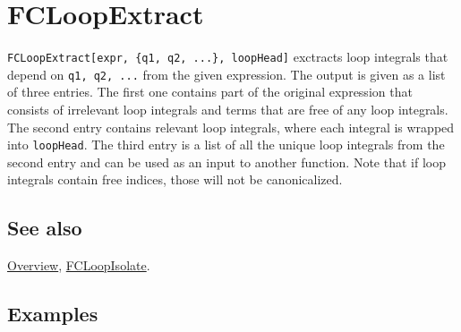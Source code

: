 \documentclass[../FeynCalcManual.tex]{subfiles}
\begin{document}
\hypertarget{fcloopextract}{
\section{FCLoopExtract}\label{fcloopextract}}

\texttt{FCLoopExtract[\allowbreak{}expr,\ \allowbreak{}\{\allowbreak{}q1,\ \allowbreak{}q2,\ \allowbreak{}...\},\ \allowbreak{}loopHead]}
exctracts loop integrals that depend on
\texttt{q1,\ \allowbreak{}q2,\ \allowbreak{}...} from the given
expression. The output is given as a list of three entries. The first
one contains part of the original expression that consists of irrelevant
loop integrals and terms that are free of any loop integrals. The second
entry contains relevant loop integrals, where each integral is wrapped
into \texttt{loopHead}. The third entry is a list of all the unique loop
integrals from the second entry and can be used as an input to another
function. Note that if loop integrals contain free indices, those will
not be canonicalized.

\subsection{See also}

\hyperlink{toc}{Overview}, \hyperlink{fcloopisolate}{FCLoopIsolate}.

\subsection{Examples}

\begin{Shaded}
\begin{Highlighting}[]
\OperatorTok{[}\OperatorTok{[} \SpecialCharTok{{-}}\OperatorTok{]}\OperatorTok{[} \SpecialCharTok{{-}}\OperatorTok{]} \SpecialCharTok{+} \OperatorTok{[}\OperatorTok{]}\OperatorTok{[}\OperatorTok{,}\OperatorTok{]}\OperatorTok{[}\OperatorTok{,}  \SpecialCharTok{{-}}\OperatorTok{,} \OperatorTok{\{} \SpecialCharTok{{-}}\OperatorTok{,} \OperatorTok{\}]]} 
 
\OperatorTok{[}\SpecialCharTok{\%}\OperatorTok{,} \OperatorTok{\{}\OperatorTok{\},}\OperatorTok{]}
\end{Highlighting}
\end{Shaded}
\end{document}
